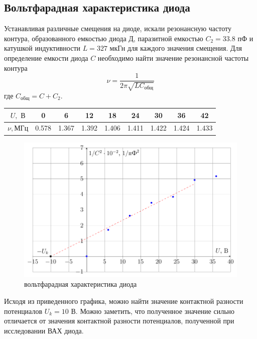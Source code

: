 \subsection{Вольтфарадная характеристика диода}
Устанавливая различные смещения на диоде, искали резонансную частоту контура,
образованного емкостью диода Д, паразитной емкостью $C_2=33.8\text{ пФ}$ и катушкой индуктивности $L=327\text{ мкГн}$ для каждого значения смещения. Для определение емкости диода $C$ необходимо найти значение резонансной частоты контура
$$\nu=\frac{1}{2\pi\sqrt{LC_\text{общ}}}$$
где $C_\text{общ}=C+C_2$.
\begin{table}[htbp]
	\centering
	\begin{tabular}{|c|c|c|c|c|c|c|c|c|}
		\toprule
		$U, \text{ В}$  & 0     & 6     & 12    & 18    & 24    & 30    & 36    & 42 \\
		\midrule
		$\nu, \text {МГц}$ & 0.578 & 1.367 & 1.392 & 1.406 & 1.411 & 1.422 & 1.424 & 1.433 \\
		\bottomrule
	\end{tabular}%
\end{table}%

\begin{figure}[H]
	\centering
	\includegraphics[width=\linewidth]{plots/plots2}
	\caption{вольтфарадная характеристика диода}
	\label{fig:8}
\end{figure}
Исходя из приведенного графика, можно найти значение контактной разности потенциалов $U_k=10\text{ В}$. Можно заметить, что полученное значение сильно отличается  от значения контактной разности потенциалов, полученной при исследовании ВАХ диода.

